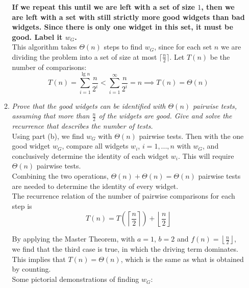 \documentclass[12pt]{article}
\begin{document}
\begin{enumerate}
\begin{enumerate}
    \textbf{If we repeat this until we are left with a set of size $1$, then we are left with a set with still strictly more good widgets than bad widgets. Since there is only one widget in this set, it must be good. Label it 
$w_G$.}\\
    
    This algorithm takes $\Theta(n)$ steps to find $w_G$, since for each set $n$ we are dividing the problem into a set of size at most $\lceil\frac{n}{2}\rceil$. Let $T(n)$ be the number of comparisons:
    \[
    T(n) = \sum_{i=1}^{\lg n} \frac{n}{2^i} < \sum_{i=1}^{\infty} \frac{n}{2^i} = n \implies T(n) = \Theta(n)
    \]
    
    \item \textit{Prove that the good widgets can be identified with $\Theta(n)$ pairwise tests, assuming that more than $\frac{n}{2}$ of the widgets are good. Give and solve the recurrence that describes the number of tests.}\\
    
    Using part (b), we find $w_G$ with $\Theta(n)$ pairwise tests. Then with the one good widget $w_G$, compare all widgets $w_i$, $i=1,...,n$ with $w_G$, and conclusively determine the identity of each widget $w_i$. This will 
require $\Theta(n)$ pairwise tests.\\
    
    Combining the two operations, $\Theta(n) + \Theta(n) = \Theta(n)$ pairwise tests are needed to determine the identity of every widget.\\
    
    The recurrence relation of the number of pairwise comparisons for each step is
    \[
    T(n) = T\left(\left\lceil\frac{n}{2}\right\rceil\right) + \left\lfloor\frac{n}{2}\right\rfloor
    \]
    
    By applying the Master Theorem, with $a=1$, $b=2$ and $f(n) = \left\lfloor\frac{n}{2}\right\rfloor$, we find that the third case is true, in which the driving term dominates. This implies that $\boxed{T(n) = \Theta(n)}$, which 
is the same as what is obtained by counting.\\
    
    Some pictorial demonstrations of finding $w_G$:\\
    \begin{center}
   	\begin{tabular}{ccc}
    

\end{tabular}
\end{center}
\end{enumerate}
\end{enumerate}
\end{document}
